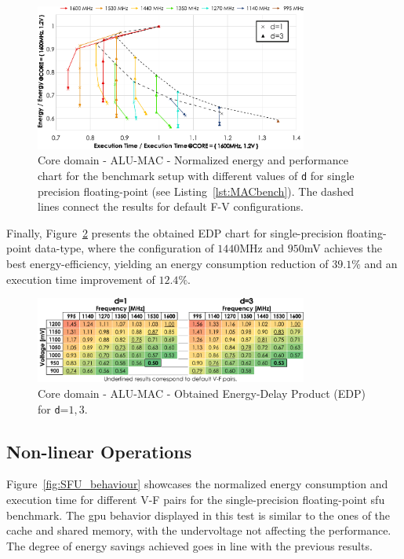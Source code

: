 \begin{figure}[htb]
  \centering
  \includegraphics[width=0.8\textwidth]{Figures/GPU_characterization/MAC_behaviour_d_1_3.pdf}
  \caption{Core domain - ALU-MAC - Normalized energy and performance chart for the benchmark setup with different values of \texttt{d} for single precision floating-point (see Listing~\ref{lst:MACbench}). The dashed lines connect the results for default F-V configurations.}
  \label{fig:MAC_behaviour}
\end{figure}

Finally, Figure~\ref{fig:MAC_EDP} presents the obtained EDP chart for single-precision floating-point data-type, where the configuration of $1440$MHz and $950$mV achieves the best energy-efficiency, yielding an energy consumption reduction of $39.1\%$ and an execution time improvement of $12.4\%$.

\begin{figure}[htb]
    \centering
        \includegraphics[width=0.8\textwidth]{Figures/GPU_characterization/MAC_EDP.pdf}
        \caption{Core domain - ALU-MAC - Obtained Energy-Delay Product (EDP) for \texttt{d}=${1,3}$.}
    \label{fig:MAC_EDP}
\end{figure}

\newpage
\subsection{Non-linear Operations}

Figure~\ref{fig:SFU_behaviour} showcases the normalized energy consumption and execution time for different V-F pairs for the single-precision floating-point \acrshort{sfu} benchmark. The \acrshort{gpu} behavior displayed in this test is similar to the ones of the cache and shared memory, with the undervoltage not affecting the performance. The degree of energy savings achieved goes in line with the previous results.



